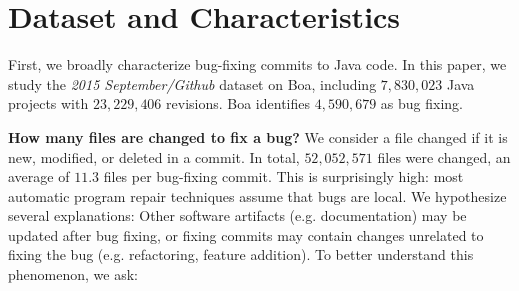 \documentclass{sig-alternate-05-2015}
\begin{document}
\section{Dataset and Characteristics}

First, we broadly characterize bug-fixing commits to Java code.  In this paper,
we study the \emph{2015 September/Github} dataset on Boa, including $7,830,023$
Java projects with $23,229,406$ revisions. Boa identifies $4,590,679$ as bug
fixing.

\vspace{1ex}
\noindent\textbf{How many files are changed to fix a bug?}
%
We consider a file changed if it is new, modified, or
deleted in a commit. In total, $52,052,571$ files were changed, an average of 
$11.3$ files per bug-fixing commit.  This is surprisingly high:
most automatic program repair techniques assume that bugs are local.
We hypothesize several explanations: Other
software artifacts (e.g.  documentation) may be updated after bug  
fixing, or fixing commits may contain changes
unrelated to fixing the bug (e.g. refactoring, feature addition). 
To better understand this
phenomenon, we ask:
\end{document}
